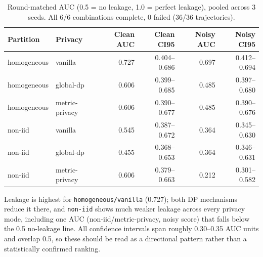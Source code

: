 \documentclass[11pt]{article}
\newcommand{\code}[1]{\texttt{#1}}
\begin{document}
\begin{table}[h!]
\centering
\begin{tabular}{llrrrr}
\toprule
Partition & Privacy & Clean AUC & Clean CI95 & Noisy AUC & Noisy CI95 \\
\midrule
homogeneous & vanilla & 0.727 & 0.404--0.686 & 0.697 & 0.412--0.694 \\
homogeneous & global-dp & 0.606 & 0.399--0.685 & 0.485 & 0.397--0.680 \\
homogeneous & metric-privacy & 0.606 & 0.390--0.677 & 0.485 & 0.390--0.676 \\
non-iid & vanilla & 0.545 & 0.387--0.672 & 0.364 & 0.345--0.630 \\
non-iid & global-dp & 0.455 & 0.368--0.653 & 0.364 & 0.346--0.631 \\
non-iid & metric-privacy & 0.606 & 0.379--0.663 & 0.212 & 0.301--0.582 \\
\bottomrule
\end{tabular}
\caption*{Round-matched AUC (0.5 = no leakage, 1.0 = perfect leakage), pooled across 3 seeds.
All 6/6 combinations complete, 0 failed (36/36 trajectories).}
\end{table}

\noindent
Leakage is highest for \code{homogeneous/vanilla} (0.727); both DP mechanisms reduce it there,
and \code{non-iid} shows much weaker leakage across every privacy mode, including one AUC
(non-iid/metric-privacy, noisy score) that falls below the 0.5 no-leakage line. All confidence
intervals span roughly 0.30--0.35 AUC units and overlap 0.5, so these should be read as a
directional pattern rather than a statistically confirmed ranking.
\end{document}
